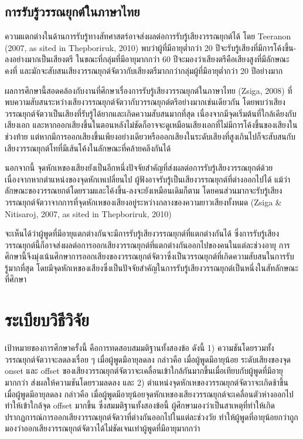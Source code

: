 \documentclass[a4paper]{article}
\begin{document}
\subsection{การรับรู้วรรณยุกต์ในภาษาไทย}
    ความแตกต่างในด้านการรับรู้ทางสัทศาสตร์อาจส่งผลต่อการรับรู้เสียงวรรณยุกต์ได้ โดย Teeranon (2007, as sited in Thepboriruk, 2010) พบว่าผู้ที่มีอายุต่ำกว่า 20 ปีจะรับรู้เสียงที่มีการโค้งขึ้น-ลงอย่างมากเป็นเสียงตรี ในขณะที่กลุ่มที่มีอายุมากกว่า 60 ปีจะมองว่าเสียงตรีคือเสียงสูงที่มีลักษณะคงที่ และมักจะสับสนเสียงวรรณยุกต์จัตวากับเสียงตรีมากกว่ากลุ่มผู้ที่มีอายุต่ำกว่า 20 ปีอย่างมาก

    ผลการศึกษานี้สอดคล้องกับงานที่ศึกษาเรื่องการรับรู้เสียงวรรณยุกต์ในภาษาไทย (Zsiga, 2008) ที่พบความสับสนระหว่างเสียงวรรณยุกต์จัตวากับวรรณยุกต์ตรีอย่างมากเช่นเดียวกัน โดยพบว่าเสียงวรรณยุกต์จัตวาเป็นเสียงที่รับรู้ได้ยากและเกิดความสับสนมากที่สุด เนื่องจากมีจุดเริ่มต้นที่ใกล้เคียงกับเสียงเอก และหากออกเสียงขึ้นในตอนหลังไม่ชัดก็อาจจะดูเหมือนเสียงเอกที่ไม่มีการโค้งขึ้นของเสียงในช่วงท้าย แต่หากมีการออกเสียงขึ้นเพียงอย่างเดียวหรือออกเสียงในระดับเสียงที่สูงเกินไปก็จะสับสนกับเสียงวรรณยุกต์โทที่มีเส้นโค้งในลักษณะที่คล้ายคลึงกันได้

    นอกจากนี้ จุดหักเหของเสียงยังเป็นอีกหนึ่งปัจจัยสำคัญที่ส่งผลต่อการรับรู้เสียงวรรณยุกต์ด้วย เนื่องจากหากตำแหน่งของจุดหักเหเปลี่ยนไป ผู้ฟังอาจรับรู้เป็นเสียงวรรณยุกต์ที่ต่างออกไปได้ แม้ว่าลักษณะของวรรณยกต์โดยรวมและโค้งขึ้น-ลงจะยังเหมือนเดิมก็ตาม โดยคนส่วนมากจะรับรู้เสียงวรรณยุกต์จัตวาจากการที่จุดหักเหของเสียงอยู่ระหว่างกลางของความยาวเสียงทั้งหมด (Zsiga \& Nitisaroj, 2007, as sited in Thepboriruk, 2010)

    จะเห็นได้ว่าผู้พูดที่มีอายุแตกต่างกันจะมีการรับรู้เสียงวรรณยุกต์ที่แตกต่างกันได้ ซึ่งการรับรู้เสียงวรรณยุกต์นี้ก็อาจส่งผลต่อการออกเสียงวรรณยุกต์ที่แตกต่างกันออกไปของคนในแต่ละช่วงอายุ การศึกษานี้จึงมุ่งเน้นศึกษาการออกเสียงของวรรณยุกต์จัตวาซึ่งเป็นวรรณยุกต์ที่เกิดความสับสนในการรับรู้มากที่สุด โดยมีจุดหักเหของเสียงซึ่งเป็นปัจจัยสำคัญในการรับรู้เสียงวรรณยุกต์เป็นหนึ่งในสัทลักษณะที่ศึกษา
\section{ระเบียบวิธีวิจัย}
    เป้าหมายของการศึกษาครั้งนี้ คือการทดสอบสมมติฐานทั้งสองข้อ ดังนี้ 1) ความชันโดยรวมทั้งวรรณยุกต์จัตวาจะลดลงเรื่อย ๆ เมื่อผู้พูดมีอายุลดลง กล่าวคือ เมื่อผู้พูดมีอายุน้อย ระดับเสียงของจุด onset และ offset ของเสียงวรรณยุกต์จัตวาจะเคลื่อนเข้าใกล้กันมากขึ้นเมื่อเทียบกับผู้พูดที่มีอายุมากกว่า ส่งผลให้ความชันโดยรวมลดลง และ 2)  ตำแหน่งจุดหักเหของวรรณยุกต์จัตวาจะเกิดช้าขึ้น เมื่อผู้พูดมีอายุลดลง กล่าวคือ เมื่อผู้พูดมีอายุน้อยจุดหักเหของเสียงวรรณยุกต์จะเคลื่อนตัวห่างออกไป ทำให้เข้าใกล้จุด offset มากขึ้น ซึ่งสมมติฐานทั้งสองข้อนี้ ผู้ศึกษามองว่าเป็นสาเหตุที่ทำให้เกิดปรากฏการณ์การออกเสียงวรรณยุกต์จัตวาที่ต่างกันออกไปในแต่ละช่วงวัย ทำให้ผู้พูดที่อายุน้อยกว่าถูกมองว่าออกเสียงวรรณยุกต์จัตวาได้ไม่ชัดเจนเท่าผู้พูดที่มีอายุมากกว่า
\end{document}

